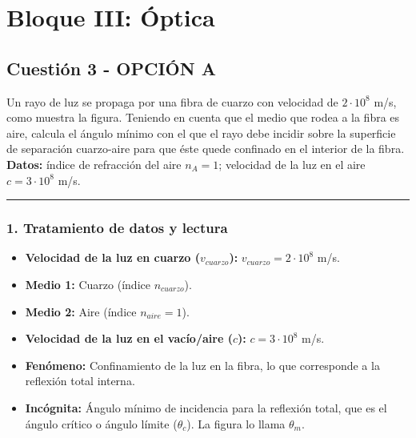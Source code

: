 \newpage

\section{Bloque III: Óptica}
\label{sec:optica_2010_jun_ord}

\subsection{Cuestión 3 - OPCIÓN A}
\label{subsec:3A_2010_jun_ord}
\begin{cajaenunciado}
Un rayo de luz se propaga por una fibra de cuarzo con velocidad de $2 \cdot 10^8$ m/s, como muestra la figura. Teniendo en cuenta que el medio que rodea a la fibra es aire, calcula el ángulo mínimo con el que el rayo debe incidir sobre la superficie de separación cuarzo-aire para que éste quede confinado en el interior de la fibra.
\textbf{Datos:} índice de refracción del aire $n_{A}=1$; velocidad de la luz en el aire $c=3 \cdot 10^8$ m/s.
\end{cajaenunciado}
\hrule

\subsubsection*{1. Tratamiento de datos y lectura}
\begin{itemize}
    \item \textbf{Velocidad de la luz en cuarzo ($v_{cuarzo}$):} $v_{cuarzo} = 2 \cdot 10^8$ m/s.
    \item \textbf{Medio 1:} Cuarzo (índice $n_{cuarzo}$).
    \item \textbf{Medio 2:} Aire (índice $n_{aire} = 1$).
    \item \textbf{Velocidad de la luz en el vacío/aire ($c$):} $c = 3 \cdot 10^8$ m/s.
    \item \textbf{Fenómeno:} Confinamiento de la luz en la fibra, lo que corresponde a la reflexión total interna.
    \item \textbf{Incógnita:} Ángulo mínimo de incidencia para la reflexión total, que es el ángulo crítico o ángulo límite ($\theta_c$). La figura lo llama $\theta_m$.
\end{itemize}

